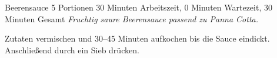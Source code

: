 \begin{recipe}{Beerensauce} {5 Portionen} {30 Minuten Arbeitszeit, 0 Minuten Wartezeit, 30 Minuten Gesamt}
  \freeform{}\textit{Fruchtig saure Beerensauce passend zu Panna Cotta.}


  Zutaten vermischen und 30–45 Minuten aufkochen bis die Sauce eindickt.
  Anschließend durch ein Sieb drücken.

  \freeform{}\hrulefill{}
\end{recipe}
